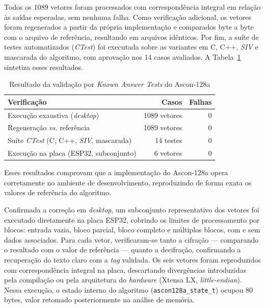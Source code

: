 Todos os 1089 vetores foram processados com correspondência integral em relação às saídas esperadas, sem nenhuma falha. Como verificação adicional, os vetores foram regenerados a partir da própria implementação e comparados byte a byte com o arquivo de referência, resultando em arquivos idênticos. Por fim, a suíte de testes automatizados (\textit{CTest}) foi executada sobre as variantes em C, C++, \textit{SIV} e mascarada do algoritmo, com aprovação nos 14 casos avaliados. A Tabela~\ref{tab:kat_ascon128a} sintetiza esses resultados.

\begin{table}[htb]
\centering
\caption{Resultado da validação por \textit{Known Answer Tests} do Ascon-128a}
\label{tab:kat_ascon128a}
\begin{tabular}{lrr}
\hline
\textbf{Verificação} & \textbf{Casos} & \textbf{Falhas} \\
\hline
Execução exaustiva (\textit{desktop})                  & 1089 vetores & 0 \\
Regeneração \textit{vs.} referência                    & 1089 vetores & 0 \\
Suíte \textit{CTest} (C, C++, \textit{SIV}, mascarada) & 14 testes    & 0 \\
Execução na placa (ESP32, subconjunto)                 & 6 vetores    & 0 \\
\hline
\end{tabular}
\end{table}

Esses resultados comprovam que a implementação do Ascon-128a opera corretamente no ambiente de desenvolvimento, reproduzindo de forma exata os valores de referência do algoritmo.

Confirmada a correção em \textit{desktop}, um subconjunto representativo dos vetores foi executado diretamente na placa ESP32, cobrindo os limites de processamento por blocos: entrada vazia, bloco parcial, bloco completo e múltiplos blocos, com e sem dados associados. Para cada vetor, verificaram-se tanto a cifração — comparando o resultado com o valor de referência — quanto a decifração, confirmando a recuperação do texto claro com a \textit{tag} validada. Os seis vetores foram reproduzidos com correspondência integral na placa, descartando divergências introduzidas pela compilação ou pela arquitetura do \textit{hardware} (Xtensa LX, \textit{little-endian}). Nessa execução, o estado interno do algoritmo (\texttt{ascon128a\_state\_t}) ocupou 80 bytes, valor retomado posteriormente na análise de memória.

